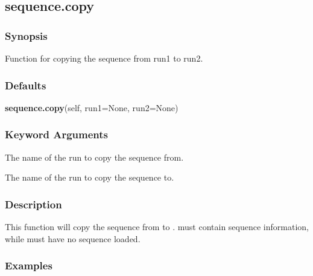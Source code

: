 



  

 \newpage 

 \subsection{sequence.copy} 

  
 \subsubsection{Synopsis} 

 Function for copying the sequence from run1 to run2. 
  

  
 \subsubsection{Defaults} 

 \textsf{\textbf{sequence.copy}(self, run1=None, run2=None)} 

  
 \subsubsection{Keyword Arguments} 

   The name of the run to copy the sequence from.   

   The name of the run to copy the sequence to.  

  

  
 \subsubsection{Description} 

 This function will copy the sequence from  to .   must contain sequence information, while  must have no sequence loaded. 
  

  
 \subsubsection{Examples} 

